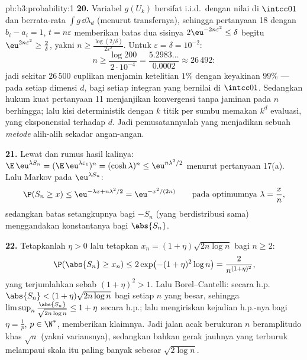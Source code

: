 \begin{solution}{pb:b3:probability:1}
\textbf{20.} Variabel $g(U_k)$ bersifat i.i.d.\ dengan nilai di
$\intcc01$ dan berrata-rata $\int g\,\dd\lambda_d$ (menurut transfernya), sehingga
pertanyaan 18 dengan $b_i - a_i = 1$, $t = n\varepsilon$ memberikan
batas dua sisinya $2\eu^{-2n\varepsilon^2} \leq \delta$
begitu $\eu^{2n\varepsilon^2} \geq \frac2\delta$, yakni
$n \geq \frac{\log(2/\delta)}{2\varepsilon^2}$. Untuk
$\varepsilon = \delta = 10^{-2}$:
\[
n \geq \frac{\log 200}{2\cdot10^{-4}} =
\frac{5.2983\ldots}{0.0002} \approx 26\,492 :
\]
jadi sekitar $26\,500$ cuplikan menjamin ketelitian $1\%$ dengan
keyakinan $99\%$ --- pada setiap dimensi $d$, bagi setiap
integran  yang bernilai di $\intcc01$. Sedangkan hukum kuat
pertanyaan 11 menjanjikan konvergensi tanpa jaminan pada $n$ berhingga;
lalu kisi deterministik dengan $k$ titik per sumbu
memakan $k^d$ evaluasi, yang eksponensial terhadap $d$. Jadi pemusatannyalah
yang menjadikan  sebuah \emph{metode} alih-alih sekadar
angan-angan.

\textbf{21.} Lewat  dan rumus hasil kalinya:
$\E\,\eu^{\lambda S_n} = (\E\,\eu^{\lambda\varepsilon_1})^n
= (\cosh\lambda)^n \leq \eu^{n\lambda^2/2}$ menurut pertanyaan
17(a). Lalu Markov pada $\eu^{\lambda S_n}$:
\[
\P(S_n \geq x) \leq \eu^{-\lambda x + n\lambda^2/2}
= \eu^{-x^2/(2n)}
\qquad\text{pada optimumnya } \lambda = \frac xn,
\]
sedangkan batas setangkupnya bagi $-S_n$ (yang berdistribusi sama) menggandakan
konstantanya bagi $\abs{S_n}$.

\textbf{22.} Tetapkanlah $\eta > 0$ lalu tetapkan $x_n = (1 +
\eta)\sqrt{2n\log n}$ bagi $n \geq 2$:
\[
\P(\abs{S_n} \geq x_n) \leq 2\exp\bigl(-(1 +
\eta)^2\log n\bigr) = \frac{2}{n^{(1+\eta)^2}},
\]
yang terjumlahkan sebab $(1 + \eta)^2 > 1$. Lalu Borel--Cantelli: secara h.p.\
$\abs{S_n} < (1 + \eta)\sqrt{2n\log n}$ bagi setiap $n$ yang besar,
sehingga $\limsup_n\frac{\abs{S_n}}{\sqrt{2n\log n}} \leq 1 +
\eta$ secara h.p.; lalu mengiriskan kejadian h.p.-nya bagi $\eta =
\frac1p$, $p \in \N^*$, memberikan klaimnya. Jadi jalan acak berukuran
$n$ beramplitudo khas $\sqrt n$ (yakni variansnya), sedangkan
bahkan gerak jauhnya yang terburuk melampaui skala itu paling banyak sebesar
$\sqrt{2\log n}$.


\end{solution}
